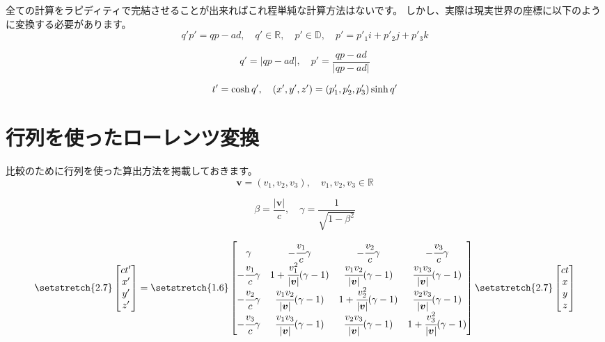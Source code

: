 \documentclass[a4paper,12pt,notitlepage]{jsreport}
\begin{document}
全ての計算をラピディティで完結させることが出来ればこれ程単純な計算方法はないです。
しかし、実際は現実世界の座標に以下のように変換する必要があります。
\begin{equation}
  q'p'=qp-ad,\quad q'\in\mathbb{R},\quad p'\in\mathbb{D},\quad p'=p'_1i+p'_2j+p'_3k
\end{equation}

\begin{equation}
  q'=|qp-ad|,\quad p'=\frac{qp-ad}{|qp-ad|}
\end{equation}

\begin{equation}
  t'=\cosh q',\quad (x',y',z')=(p'_1,p'_2,p'_3)\sinh q'\\
\end{equation}

\section{行列を使ったローレンツ変換}

比較のために行列を使った算出方法を掲載しておきます。
\begin{equation}
  \bm{v}=(v_1,v_2,v_3),\quad v_1,v_2,v_3\in\mathbb{R}
\end{equation}

\begin{equation}
  \beta=\frac{|\bm{v}|}{c},\quad \gamma=\frac{1}{\sqrt{1-\beta^2}}
\end{equation}

\begin{equation}
  \setstretch{2.7}
  \begin{bmatrix}
    ct'\\x'\\y'\\z'
  \end{bmatrix}
  =
  \setstretch{1.6}
  \begin{bmatrix}
    \gamma & -\cfrac{v_1}{c}\gamma & -\cfrac{v_2}{c}\gamma & -\cfrac{v_3}{c}\gamma \\[3pt]
    -\cfrac{v_1}{c}\gamma & 1+\cfrac{v_1^2}{|\bm{v}|}(\gamma-1) & \cfrac{v_1v_2}{|\bm{v}|}(\gamma-1) & \cfrac{v_1v_3}{|\bm{v}|}(\gamma-1)\\
    -\cfrac{v_2}{c}\gamma & \cfrac{v_1v_2}{|\bm{v}|}(\gamma-1) & 1+\cfrac{v_2^2}{|\bm{v}|}(\gamma-1) & \cfrac{v_2v_3}{|\bm{v}|}(\gamma-1)\\
    -\cfrac{v_3}{c}\gamma & \cfrac{v_1v_3}{|\bm{v}|}(\gamma-1) & \cfrac{v_2v_3}{|\bm{v}|}(\gamma-1) & 1+\cfrac{v_3^2}{|\bm{v}|}(\gamma-1)
  \end{bmatrix}
  \setstretch{2.7}
  \begin{bmatrix}
    ct\\x\\y\\z
  \end{bmatrix}
\end{equation}
\end{document}
